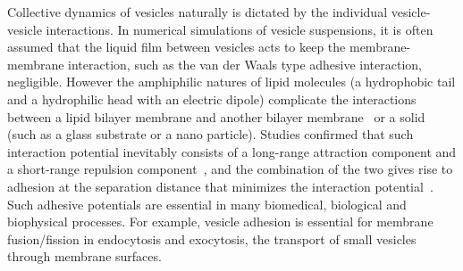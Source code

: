 \documentclass[prf,superscriptaddress,showpacs]{revtex4-1}
\begin{document}
%
%
Collective dynamics of vesicles naturally is dictated by the individual
vesicle-vesicle interactions.  In numerical simulations of vesicle
suspensions, it is often assumed that the liquid film between vesicles
acts to keep the membrane-membrane interaction, such as the van der
Waals type adhesive interaction, negligible.  However the amphiphilic
natures of lipid molecules (a hydrophobic tail and a hydrophilic head
with an electric dipole) complicate the interactions between a lipid
bilayer membrane and another bilayer
membrane~\cite{EvansMetcalfe1984_BJ, Book_PhysicalBasisCellAdhesion,
Book_IntermolecularSurfaceForces} or a solid (such as a glass substrate
or a nano particle).  Studies confirmed that such interaction potential
inevitably consists of a long-range attraction component and a
short-range repulsion component~\cite{Book_IntermolecularSurfaceForces},
and the combination of the two gives rise to adhesion at the separation
distance that minimizes the interaction
potential~\cite{Book_IntermolecularSurfaceForces}. Such adhesive
potentials are essential in many biomedical, biological and biophysical
processes.  For example, vesicle adhesion is essential for membrane
fusion/fission in endocytosis and exocytosis, the transport of small
vesicles through membrane surfaces.
\end{document}
